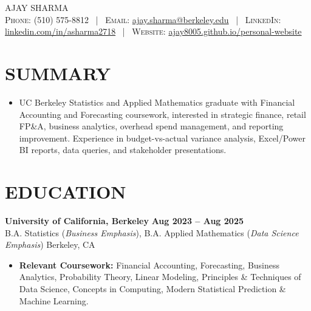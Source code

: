 \documentclass[a4paper,10pt]{article}
\renewcommand{\$}{{\fontencoding{OT1}\selectfont\char36}}
\begin{document}
\fontsize{10}{11.8}\selectfont
\begin{center}
{\fontsize{24.88}{27}\selectfont AJAY SHARMA}\\[-1pt]
\textsc{Phone:} (510) 575-8812 \, | \,
\textsc{Email:} \href{mailto:ajay.sharma@berkeley.edu}{ajay.sharma@berkeley.edu} \, | \,
\textsc{LinkedIn:} \href{https://www.linkedin.com/in/asharma2718/}{linkedin.com/in/asharma2718} \, | \,
\textsc{Website:} \href{https://ajay8005.github.io/personal-website/}{ajay8005.github.io/personal-website}
\end{center}
\vspace{-7pt}
\section*{SUMMARY}
\begin{itemize}
\item UC Berkeley Statistics and Applied Mathematics graduate with Financial Accounting and Forecasting coursework, interested in strategic finance, retail FP\&A, business analytics, overhead spend management, and reporting improvement. Experience in budget-vs-actual variance analysis, Excel/Power BI reports, data queries, and stakeholder presentations.
\end{itemize}

\section*{EDUCATION}
\textbf{University of California, Berkeley} \hfill \textbf{Aug 2023 -- Aug 2025}\\
B.A. Statistics (\textit{Business Emphasis}), B.A. Applied Mathematics (\textit{Data Science Emphasis}) \hfill Berkeley, CA
\begin{itemize}
\item \textbf{Relevant Coursework:} Financial Accounting, Forecasting, Business Analytics, Probability Theory, Linear Modeling, Principles \& Techniques of Data Science, Concepts in Computing, Modern Statistical Prediction \& Machine Learning.
\end{itemize}
\end{document}
